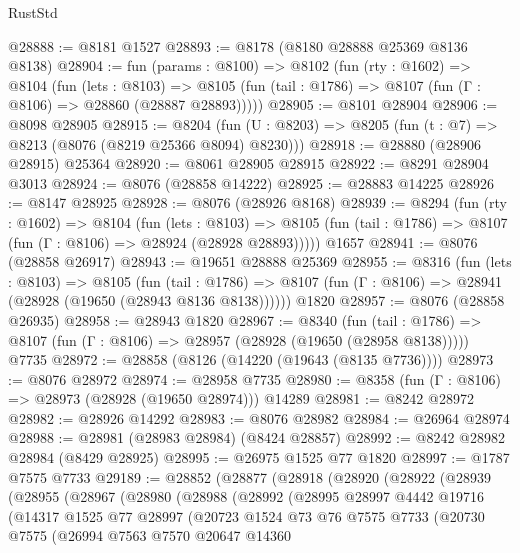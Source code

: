 \begin{lexlean}{RustStd}
\begin{coremodule}
@28888 := @8181 @1527
@28893 := @8178 (@8180 @28888 @25369 @8136 @8138)
@28904 := fun (params : @8100) =>
  @8102
    (fun (rty : @1602) =>
    @8104
      (fun (lets : @8103) =>
      @8105 (fun (tail : @1786) => @8107 (fun (Γ : @8106) => @28860 (@28887 @28893)))))
@28905 := @8101 @28904
@28906 := @8098 @28905
@28915 := @8204
    (fun (U : @8203) => @8205 (fun (t : @7) => @8213 (@8076 (@8219 @25366 @8094) @8230)))
@28918 := @28880 (@28906 @28915) @25364
@28920 := @8061 @28905 @28915
@28922 := @8291 @28904 @3013
@28924 := @8076 (@28858 @14222)
@28925 := @28883 @14225
@28926 := @8147 @28925
@28928 := @8076 (@28926 @8168)
@28939 := @8294
    (fun (rty : @1602) =>
    @8104
      (fun (lets : @8103) =>
      @8105 (fun (tail : @1786) => @8107 (fun (Γ : @8106) => @28924 (@28928 @28893)))))
    @1657
@28941 := @8076 (@28858 @26917)
@28943 := @19651 @28888 @25369
@28955 := @8316
    (fun (lets : @8103) =>
    @8105
      (fun (tail : @1786) =>
      @8107 (fun (Γ : @8106) => @28941 (@28928 (@19650 (@28943 @8136 @8138))))))
    @1820
@28957 := @8076 (@28858 @26935)
@28958 := @28943 @1820
@28967 := @8340
    (fun (tail : @1786) => @8107 (fun (Γ : @8106) => @28957 (@28928 (@19650 (@28958 @8138)))))
    @7735
@28972 := @28858 (@8126 (@14220 (@19643 (@8135 @7736))))
@28973 := @8076 @28972
@28974 := @28958 @7735
@28980 := @8358 (fun (Γ : @8106) => @28973 (@28928 (@19650 @28974))) @14289
@28981 := @8242 @28972
@28982 := @28926 @14292
@28983 := @8076 @28982
@28984 := @26964 @28974
@28988 := @28981 (@28983 @28984) (@8424 @28857)
@28992 := @8242 @28982 @28984 (@8429 @28925)
@28995 := @26975 @1525 @77 @1820
@28997 := @1787 @7575 @7733
@29189 := @28852
    (@28877
      (@28918
        (@28920
          (@28922
            (@28939
              (@28955
                (@28967
                  (@28980
                    (@28988
                      (@28992
                        (@28995
                          @28997
                          @4442
                          @19716
                          (@14317
                            @1525
                            @77
                            @28997
                            (@20723
                              @1524
                              @73
                              @76
                              @7575
                              @7733
                              (@20730
                                @7575
                                (@26994
                                  @7563
                                  @7570
                                  @20647
                                  @14360

\end{coremodule}
\end{lexlean}
